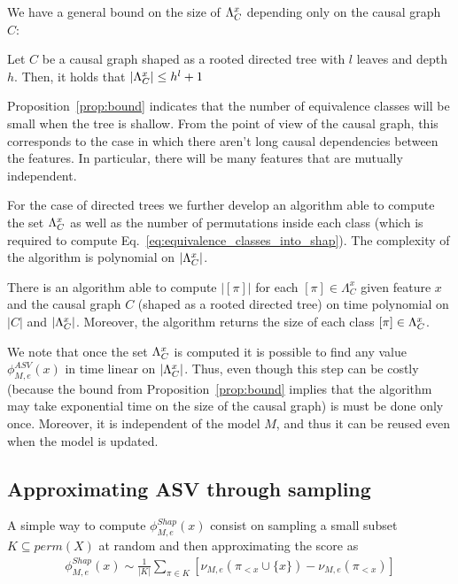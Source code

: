 \vspace{-0.5cm}

We have a general bound on the size of $\Lambda_C^x$ depending only on the causal graph $C$:

\begin{proposition}\label{prop:bound}
	Let $C$ be a causal graph shaped as a rooted directed tree with $l$ leaves and depth $h$. Then, it holds that $|\Lambda_C^x|\leq h^l + 1$	
\end{proposition}

Proposition~\ref{prop:bound} indicates that the number of equivalence classes will be small when the tree is shallow. From the point of view of the causal graph, this corresponds to the case in which there aren't long causal dependencies between the features. In particular, there will be many features that are mutually independent.

For the case of directed trees we further develop an algorithm able to compute the set $\Lambda_C^x$ as well as the number of permutations inside each class (which is required to compute Eq.~\eqref{eq:equivalence_classes_into_shap}). The complexity of the algorithm
is polynomial on $|\Lambda_C^x|$.

\begin{proposition}
	There is an algorithm able to compute $|[\pi]|$ for each $[\pi] \in \Lambda^x_C$ given feature $x$ and the causal graph $C$ (shaped as a rooted directed tree) on time polynomial on $|C|$ and $|\Lambda_C^x|$. Moreover, the algorithm returns the size of each class $[\pi] \in \Lambda_C^x$.
\end{proposition}

We note that once the set $\Lambda_C^x$ is computed it is possible to find any value $\phi_{M,e}^{ASV}(x)$ in time linear on $|\Lambda_C^x|$. Thus, even though this step can be costly
(because the bound from Proposition~\ref{prop:bound} implies that the algorithm may take exponential time on the size of the causal graph) is must be done only once. Moreover, it is independent of the model $M$, and thus it can be reused even
when the model is updated.

\subsection{Approximating ASV through sampling}

\newcommand{\subsetPerm}{K}

A simple way to compute $\phi_{M,e}^{Shap}(x)$ consist on sampling a small subset $\subsetPerm \subseteq perm(X)$ at random and then approximating the score as
%
\begin{align*}
	\phi^{Shap}_{M,e}(x) \sim \frac{1}{|\subsetPerm|} \sum_{\pi \in \subsetPerm} \left[ \nu_{M,e}(\pi_{<x} \cup \{x\}) - \nu_{M,e}(\pi_{<x}) \right]
\end{align*}


